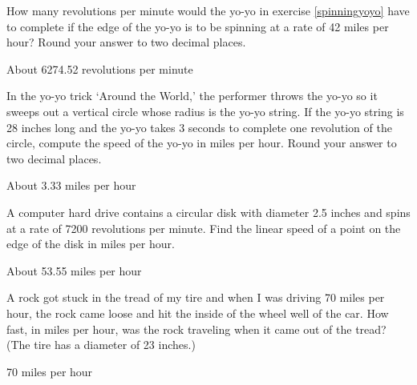 \documentclass{ximera}
\begin{document}
\begin{problem}
    How many revolutions per minute would the yo-yo in exercise \ref{spinningyoyo} have to complete if the edge of the yo-yo is to be spinning at a rate of 42 miles per hour?  Round your answer to two decimal places.

\begin{solution}
About 6274.52 revolutions per minute
\end{solution}

\end{problem}



\begin{problem}\label{yoyotrick}
    In the yo-yo trick `Around the World,' the performer throws the yo-yo so it sweeps out a vertical circle whose radius is the yo-yo string. If the yo-yo string is 28 inches long and the yo-yo takes 3 seconds to complete one revolution of the circle, compute the speed of the yo-yo in miles per hour.  Round your answer to two decimal places.

\begin{solution}
About 3.33 miles per hour
\end{solution}

\end{problem}



\begin{problem}\label{harddrive} 
    A computer hard drive contains a circular disk with diameter 2.5 inches and spins at a rate of 7200 revolutions per minute.  Find the linear speed of a point on the edge of the disk in miles per hour.

\begin{solution}
About 53.55 miles per hour
\end{solution}

\end{problem}



\begin{problem}
     A rock got stuck in the tread of my tire and when I was driving 70 miles per hour, the rock came loose and hit the inside of the wheel well of the car.  How fast, in miles per hour, was the rock traveling when it came out of the tread?  (The tire has a diameter of 23 inches.)

\begin{solution}
70 miles per hour
\end{solution}

\end{problem}
\end{document}
